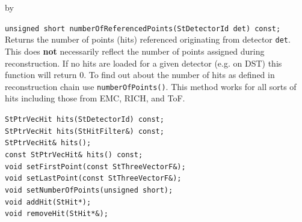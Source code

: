 \documentclass[twoside]{article}
\newcommand{\entrylabel}[1]{\mbox{\textbf{{#1}}}\hfil}%
\newenvironment{entry}
{\begin{list}{}%
    {\renewcommand{\makelabel}{\entrylabel}%
     \setlength{\labelwidth}{90pt}%
     \setlength{\leftmargin}{\labelwidth}
     \advance\leftmargin by \labelsep%
      }%
    }%
  {\end{list}}
\newcommand{\Entrylabel}[1]%
{\raisebox{0pt}[1ex][0pt]{\makebox[\labelwidth][l]%
    {\parbox[t]{\labelwidth}{\hspace{0pt}\textbf{{#1}}}}}}
\newenvironment{Entry}%
{\renewcommand{\entrylabel}{\Entrylabel}\begin{entry}}%
  {\end{entry}}
\begin{document}
\begin{Entry}
    \verb+unsigned short numberOfReferencedPoints(StDetectorId det) const;+\\
    Returns the number of points (hits) referenced originating from
    detector \texttt{det}. This does \textbf{not} necessarily reflect
    the number of points assigned during reconstruction. If no hits
    are loaded for a given detector (e.g. on DST) this function will
    return 0. To find out about the number of hits as defined in
    reconstruction chain use \texttt{numberOfPoints()}.
    This method works for all sorts of hits including those from EMC, RICH, and ToF.

    
    \verb+StPtrVecHit hits(StDetectorId) const;+\\
    \verb+StPtrVecHit hits(StHitFilter&) const;+\\
    \verb+StPtrVecHit& hits();+\\
    \verb+const StPtrVecHit& hits() const;+\\
    \verb+void setFirstPoint(const StThreeVectorF&);+\\
    \verb+void setLastPoint(const StThreeVectorF&);+\\
    \verb+void setNumberOfPoints(unsigned short);+\\
    \verb+void addHit(StHit*);+\\
    \verb+void removeHit(StHit*&);+\\
\end{Entry}
\clearpage
\end{document}
